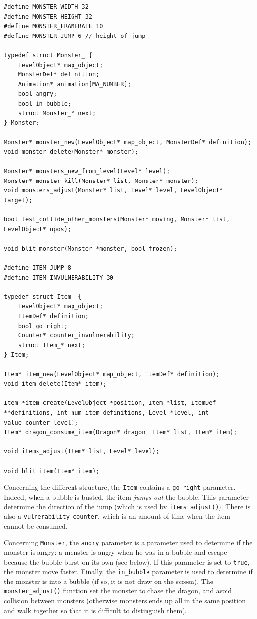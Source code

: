 \documentclass[12pt,a4paper]{article}
\newcommand{\cc}[1]{\texttt{#1}}
\begin{document}
\begin{verbatim}
#define MONSTER_WIDTH 32
#define MONSTER_HEIGHT 32
#define MONSTER_FRAMERATE 10
#define MONSTER_JUMP 6 // height of jump

typedef struct Monster_ {
    LevelObject* map_object;
    MonsterDef* definition;
    Animation* animation[MA_NUMBER];
    bool angry;
    bool in_bubble;
    struct Monster_* next;
} Monster;

Monster* monster_new(LevelObject* map_object, MonsterDef* definition);
void monster_delete(Monster* monster);

Monster* monsters_new_from_level(Level* level);
Monster* monster_kill(Monster* list, Monster* monster);
void monsters_adjust(Monster* list, Level* level, LevelObject* target);

bool test_collide_other_monsters(Monster* moving, Monster* list, LevelObject* npos);

void blit_monster(Monster *monster, bool frozen);

#define ITEM_JUMP 8
#define ITEM_INVULNERABILITY 30

typedef struct Item_ {
    LevelObject* map_object;
    ItemDef* definition;
    bool go_right;
    Counter* counter_invulnerability;
    struct Item_* next;
} Item;

Item* item_new(LevelObject* map_object, ItemDef* definition);
void item_delete(Item* item);

Item *item_create(LevelObject *position, Item *list, ItemDef **definitions, int num_item_definitions, Level *level, int value_counter_level);
Item* dragon_consume_item(Dragon* dragon, Item* list, Item* item);

void items_adjust(Item* list, Level* level);

void blit_item(Item* item);
\end{verbatim}

Concerning the different structure, the \cc{Item} contains a \cc{go_right} parameter. Indeed, when a bubble is busted, the item \textit{jumps out} the bubble. This parameter determine the direction of the jump (which is used by \cc{items_adjust()}). There is also a \cc{vulnerability_counter}, which is an amount of time when the item cannot be consumed.

Concerning \cc{Monster}, the \cc{angry} parameter is a parameter used to determine if the monster is angry: a monster is angry when he was in a bubble and escape because the bubble burst on its own (see below). If this parameter is set to \cc{true}, the monster move faster. Finally, the \cc{in_bubble} parameter is used to determine if the monster is into a bubble (if so, it is not draw on the screen). The \cc{monster_adjust()} function set the monster to chase the dragon, and avoid collision between monsters (otherwise monsters ends up all in the same position and walk together so that it is difficult to distinguish them).
\end{document}

